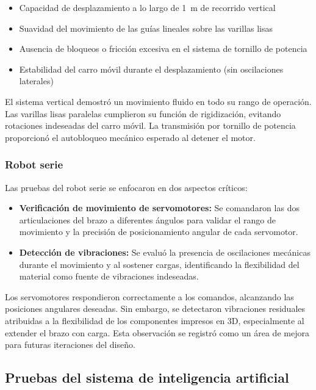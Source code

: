 \begin{itemize}
    \item Capacidad de desplazamiento a lo largo de 1~m de recorrido vertical
    \item Suavidad del movimiento de las guías lineales sobre las varillas lisas
    \item Ausencia de bloqueos o fricción excesiva en el sistema de tornillo de potencia
    \item Estabilidad del carro móvil durante el desplazamiento (sin oscilaciones laterales)
\end{itemize}

El sistema vertical demostró un movimiento fluido en todo su rango de operación. Las varillas lisas paralelas cumplieron su función de rigidización, evitando rotaciones indeseadas del carro móvil. La transmisión por tornillo de potencia proporcionó el autobloqueo mecánico esperado al detener el motor.

\subsubsection{Robot serie}

Las pruebas del robot serie se enfocaron en dos aspectos críticos:

\begin{itemize}
    \item \textbf{Verificación de movimiento de servomotores:} Se comandaron las dos articulaciones del brazo a diferentes ángulos para validar el rango de movimiento y la precisión de posicionamiento angular de cada servomotor.
    \item \textbf{Detección de vibraciones:} Se evaluó la presencia de oscilaciones mecánicas durante el movimiento y al sostener cargas, identificando la flexibilidad del material como fuente de vibraciones indeseadas.
\end{itemize}

Los servomotores respondieron correctamente a los comandos, alcanzando las posiciones angulares deseadas. Sin embargo, se detectaron vibraciones residuales atribuidas a la flexibilidad de los componentes impresos en 3D, especialmente al extender el brazo con carga. Esta observación se registró como un área de mejora para futuras iteraciones del diseño.

\subsection{Pruebas del sistema de inteligencia artificial}

